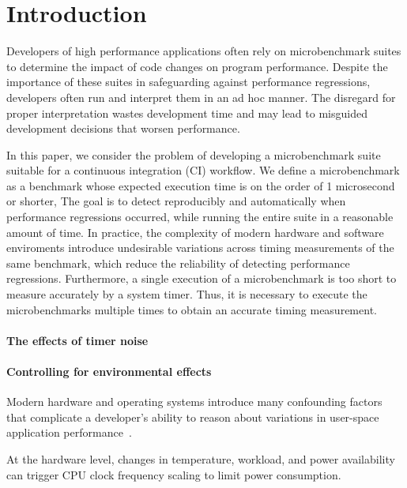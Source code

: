 \documentclass[conference]{IEEEtran}
\begin{document}
\IEEEpeerreviewmaketitle


\label{sec:intro}
\section{Introduction}

Developers of high performance applications often rely on microbenchmark suites to determine
the impact of code changes on program performance. Despite the importance of these suites in
safeguarding against performance regressions, developers often run and interpret them in an
ad hoc manner. The disregard for proper interpretation wastes development time and may
lead to misguided development decisions that worsen performance.

In this paper, we consider the problem of developing a microbenchmark suite
suitable for a continuous integration (CI) workflow. We define a microbenchmark
as a benchmark whose expected execution time is on the order of 1 microsecond
or shorter,
The goal is to detect reproducibly and automatically when performance regressions occurred,
while running the entire suite in a reasonable amount of time.
In practice, the complexity of modern hardware and software enviroments introduce
undesirable variations across timing measurements of the same benchmark, which
reduce the reliability of detecting performance regressions.
Furthermore, a single execution of a microbenchmark is too short to measure
accurately by a system timer. Thus, it is necessary to execute the
microbenchmarks multiple times to obtain an accurate timing measurement.

\paragraph{The effects of timer noise}

\paragraph{Controlling for environmental effects}
Modern hardware and operating systems introduce many confounding factors that
complicate a developer's ability to reason about variations in user-space
application performance~\cite{HP5e}.

At the hardware level, changes in temperature, workload, and power availability
can trigger CPU clock frequency scaling to limit power consumption.
\end{document}
